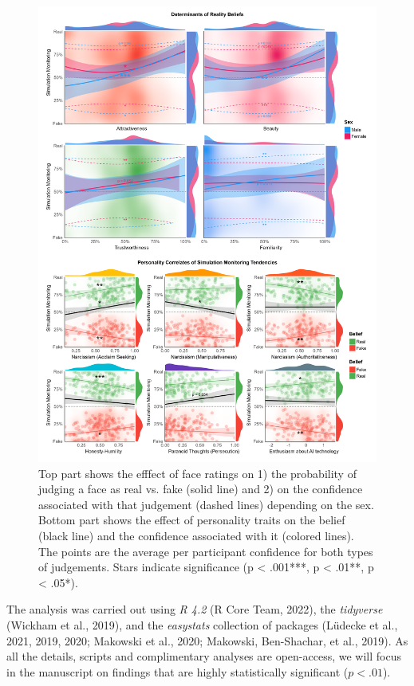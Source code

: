 \documentclass[
  man,floatsintext]{apa6}
\begin{document}
\begin{figure}
\includegraphics[width=1\linewidth]{../figures/Figure2} \caption{Top part shows the efffect of face ratings on 1) the probability of judging a face as real vs. fake (solid line) and 2) on the confidence associated with that judgement (dashed lines) depending on the sex. Bottom part shows the effect of personality traits on the belief (black line) and the confidence associated with it (colored lines). The points are the average per participant confidence for both types of judgements. Stars indicate significance (p < .001***, p < .01**, p < .05*).}\label{fig:unnamed-chunk-3}
\end{figure}

The analysis was carried out using \emph{R 4.2} (R Core Team, 2022), the \emph{tidyverse} (Wickham et al., 2019), and the \emph{easystats} collection of packages (Lüdecke et al., 2021, 2019, 2020; Makowski et al., 2020; Makowski, Ben-Shachar, et al., 2019). As all the details, scripts and complimentary analyses are open-access, we will focus in the manuscript on findings that are highly statistically significant (\(p <.01\)).
\end{document}
